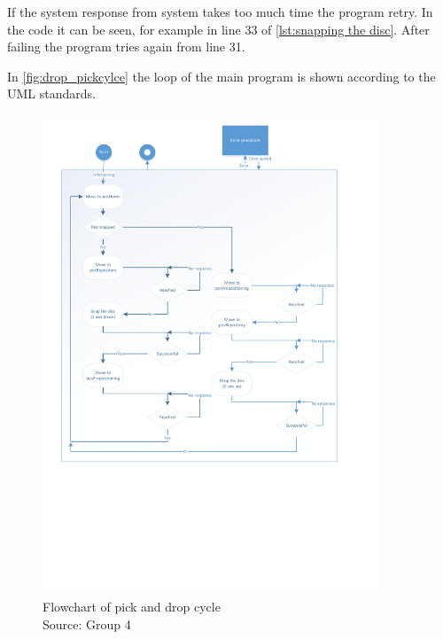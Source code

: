 \documentclass[a4paper,12pt]{scrreprt}
\begin{document}
If the system response from system takes too much time the program retry. In the code it can be seen, for example in line 33 of \autoref{lst:snapping the disc}. After failing the program tries again from line 31.

In \autoref{fig:drop_pickcylce} the loop of the main program is shown according to the \acs{UML} standards.

\begin{figure}[H]
  \centering
   \includegraphics[width=0.9\textwidth]{pictures/VisioDropcycle.pdf}
   \caption[Flowchart of pick and drop cycle]{Flowchart of pick and drop cycle\\
	Source: Group 4}
   \label{fig:drop_pickcylce}
\end{figure} 
\end{document}
